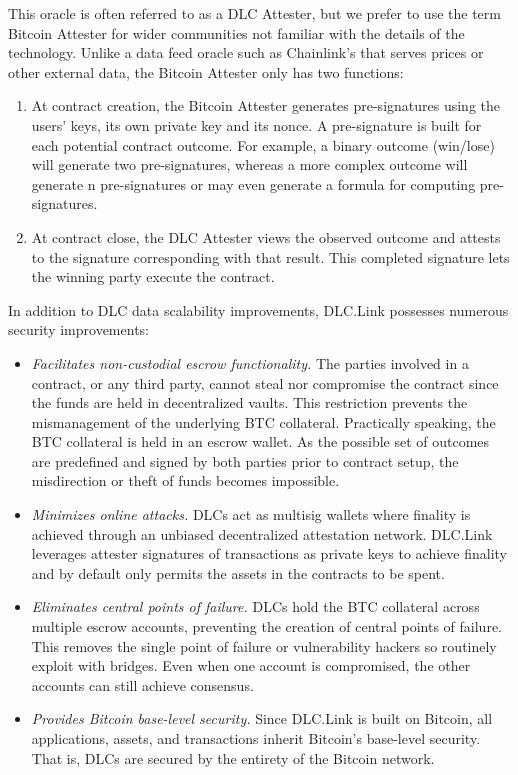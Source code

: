 \documentclass[twoside, a4paper, 11pt]{article}
\begin{document}
  This oracle is often referred to as a DLC Attester, but we prefer to use the term Bitcoin Attester for wider communities not familiar with the details of the technology. Unlike a data feed oracle such as Chainlink’s that serves prices or other external data, the Bitcoin Attester only has two functions:

  \begin{enumerate}
    \item At contract creation, the Bitcoin Attester generates pre-signatures using the users’ keys, its own private key and its nonce. A pre-signature is built for each potential contract outcome. For example, a binary outcome (win/lose) will generate two pre-signatures, whereas a more complex outcome will generate n pre-signatures or may even generate a formula for computing pre-signatures.
    \item At contract close, the DLC Attester views the observed outcome and attests to the signature corresponding with that result. This completed signature lets the winning party execute the contract.
  \end{enumerate}

  In addition to DLC data scalability improvements, DLC.Link possesses numerous security improvements:
  \begin{itemize}
    \item \emph{Facilitates non-custodial escrow functionality.} The parties involved in a contract, or any third party, cannot steal nor compromise the contract since the funds are held in decentralized vaults. This restriction prevents the mismanagement of the underlying BTC collateral. Practically speaking, the BTC collateral is held in an escrow wallet. As the possible set of outcomes are predefined and signed by both parties prior to contract setup, the misdirection or theft of funds becomes impossible.
    \item \emph{Minimizes online attacks.} DLCs act as multisig wallets where finality is achieved through an unbiased decentralized attestation network. DLC.Link leverages attester signatures of transactions as private keys to achieve finality and by default only permits the assets in the contracts to be spent.
    \item \emph{Eliminates central points of failure.} DLCs hold the BTC collateral across multiple escrow accounts, preventing the creation of central points of failure. This removes the single point of failure or vulnerability hackers so routinely exploit with bridges. Even when one account is compromised, the other accounts can still achieve consensus.
    \item  \emph{Provides Bitcoin base-level security.} Since DLC.Link is built on Bitcoin, all applications, assets, and transactions inherit Bitcoin’s base-level security. That is, DLCs are secured by the entirety of the Bitcoin network.
  \end{itemize}
\end{document}
